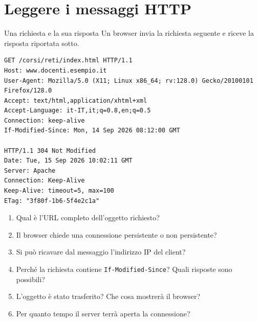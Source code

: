 
\section{Leggere i messaggi HTTP}

\begin{esercizio}{Una richiesta e la sua risposta}
Un browser invia la richiesta seguente e riceve la risposta riportata sotto.
\begin{lstlisting}[language=http]
GET /corsi/reti/index.html HTTP/1.1
Host: www.docenti.esempio.it
User-Agent: Mozilla/5.0 (X11; Linux x86_64; rv:128.0) Gecko/20100101 Firefox/128.0
Accept: text/html,application/xhtml+xml
Accept-Language: it-IT,it;q=0.8,en;q=0.5
Connection: keep-alive
If-Modified-Since: Mon, 14 Sep 2026 08:12:00 GMT

HTTP/1.1 304 Not Modified
Date: Tue, 15 Sep 2026 10:02:11 GMT
Server: Apache
Connection: Keep-Alive
Keep-Alive: timeout=5, max=100
ETag: "3f80f-1b6-5f4e2c1a"
\end{lstlisting}
\begin{enumerate}[label=(\alph*)]
    \item Qual è l'URL completo dell'oggetto richiesto?
    \item Il browser chiede una connessione persistente o non persistente?
    \item Si può ricavare dal messaggio l'indirizzo IP del client?
    \item Perché la richiesta contiene \texttt{If-Modified-Since}? Quali risposte sono possibili?
    \item L'oggetto è stato trasferito? Che cosa mostrerà il browser?
    \item Per quanto tempo il server terrà aperta la connessione?
\end{enumerate}
\end{esercizio}

